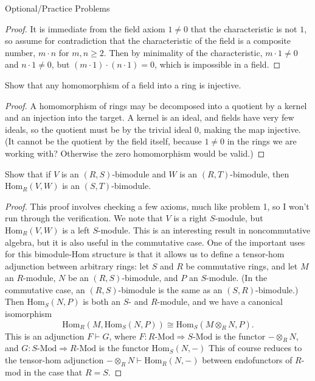 \documentclass[12pt]{article}
\theoremstyle{definition}
\newenvironment{problem}[2][Problem]{\begin{trivlist}
\item[\hskip \labelsep {\bfseries #1}\hskip \labelsep {\bfseries #2.}]}{\end{trivlist}}
\begin{document}
\begin{section}{Optional/Practice Problems}
\begin{problem}{2b}
	\end{problem}
	\begin{proof}
		It is immediate from the field axiom $1 \neq 0$ that the characteristic is not $1$, so assume for contradiction that the characteristic of the field is a composite number, $m \cdot n$ for $m, n \geq 2$. Then by minimality of the characteristic, $m \cdot 1 \neq 0$ and $n \cdot 1 \neq 0$, but $(m \cdot 1) \cdot (n \cdot 1) = 0$, which is impossible in a field.
	\end{proof}
	\begin{problem}{3}
		Show that any homomorphism of a field into a ring is injective.
	\end{problem}
	\begin{proof}
		A homomorphism of rings may be decomposed into a quotient by a kernel and an injection into the target. A kernel is an ideal, and fields have very few ideals, so the quotient must be by the trivial ideal $0$, making the map injective. (It cannot be the quotient by the field itself, because $1 \neq 0$ in the rings we are working with? Otherwise the zero homomorphism would be valid.)
	\end{proof}
	\begin{problem}{4}
		Show that if $V$ is an $(R,S)$-bimodule and $W$ is an $(R,T)$-bimodule, then $\text{Hom}_R(V,W)$ is an $(S,T)$-bimodule.	
	\end{problem}
	\begin{proof}
		This proof involves checking a few axioms, much like problem 1, so I won't run through the verification. We note that $V$ is a right $S$-module, but $\text{Hom}_R(V,W)$ is a left $S$-module. This is an interesting result in noncommutative algebra, but it is also useful in the commutative case. One of the important uses for this bimodule-Hom structure is that it allows us to define a tensor-hom adjunction between arbitrary rings: let $S$ and $R$ be commutative rings, and let $M$ an $R$-module, $N$ be an $(R,S)$-bimodule, and $P$ an $S$-module. (In the commutative case, an $(R,S)$-bimodule is the same as an $(S,R)$-bimodule.) Then $\text{Hom}_S(N,P)$ is both an $S $- and $R$-module, and we have a canonical isomorphism\[\text{Hom}_R(M, \text{Hom}_S(N,P)) \cong \text{Hom}_S(M \otimes_R N, P).\] This is an adjunction $F \vdash G$, where $F: R\text{-Mod} \Rightarrow S\text{-Mod}$ is the functor $- \otimes_R N$, and $G: S\text{-Mod} \Rightarrow R\text{-Mod}$ is the functor $\text{Hom}_S(N,-)$ This of course reduces to the tensor-hom adjunction $-\otimes_R N \vdash \text{Hom}_R(N,-)$ between endofunctors of $R$-mod in the case that $R = S$. 
	\end{proof}
\end{section}
\end{document}
